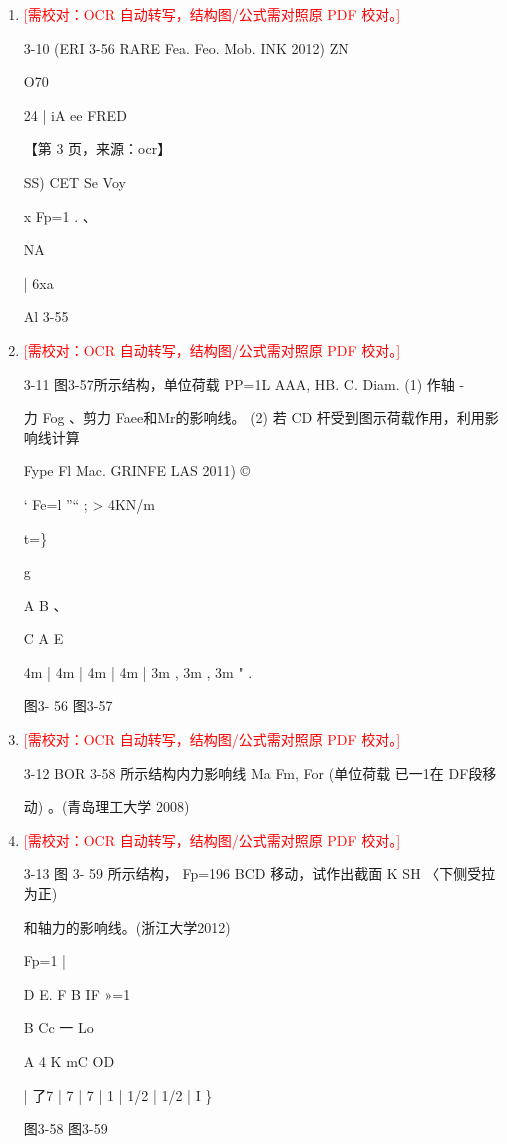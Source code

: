 \documentclass[UTF8,12pt,a4paper,openany]{ctexbook}
\newcommand{\TODO}[1]{\textcolor{red}{[需校对：#1]}}
\begin{document}
\begin{enumerate}[label=\textbf{\arabic*.},leftmargin=2em]
\item \TODO{OCR 自动转写，结构图/公式需对照原 PDF 校对。}\par 3-10 (ERI 3-56 RARE Fea. Feo. Mob. INK 2012) ZN\par O70\par 24                         |                              iA ee FRED\par \par 【第 3 页，来源：ocr】\par SS) CET Se Voy\par x       Fp=1                 .      、\par NA\par |            6xa\par Al 3-55
\item \TODO{OCR 自动转写，结构图/公式需对照原 PDF 校对。}\par 3-11 图3-57所示结构，单位荷载 PP=1L AAA, HB. C. Diam. (1) 作轴 -\par 力 Fog 、剪力 Faee和Mr的影响线。 (2) 若 CD 杆受到图示荷载作用，利用影响线计算\par Fype Fl Mac. GRINFE LAS 2011) ©\par ‘  Fe=l ”“      ;      > 4KN/m\par t=\}\par *                          g\par A           B     、\par C                    A               E\par 4m  |  4m  |  4m  |  4m |  3m  ,  3m  ,  3m  "    .\par 图3- 56       图3-57
\item \TODO{OCR 自动转写，结构图/公式需对照原 PDF 校对。}\par 3-12 BOR 3-58 所示结构内力影响线 Ma Fm, For (单位荷载 已一1在 DF段移\par 动) 。(青岛理工大学 2008)
\item \TODO{OCR 自动转写，结构图/公式需对照原 PDF 校对。}\par 3-13 图 3- 59 所示结构， Fp=196 BCD 移动，试作出截面 K SH 〈下侧受拉为正)\par 和轴力的影响线。(浙江大学2012)\par Fp=1               |\par D     E.        F         B IF »=1\par B          Cc                                   一                  Lo\par A                      4  K  mC OD\par |  了7  |  7  |  7  |  1         | 1/2 | 1/2 |  I   \}\par 图3-58                      图3-59

\end{enumerate}
\end{document}
